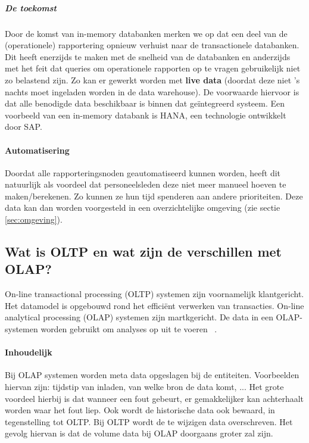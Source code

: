 \subparagraph{De toekomst}
Door de komst van in-memory databanken merken we op dat een deel van de (operationele) rapportering opnieuw verhuist naar de transactionele databanken. Dit heeft enerzijds te maken met de snelheid van de databanken en anderzijds met het feit dat queries om operationele rapporten op te vragen gebruikelijk niet zo belastend zijn. Zo kan er gewerkt worden met \textbf{live data} (doordat deze niet 's nachts moet ingeladen worden in de data warehouse). De voorwaarde hiervoor is dat alle benodigde data beschikbaar is binnen dat geïntegreerd systeem. Een voorbeeld van een in-memory databank is HANA, een technologie ontwikkelt door SAP.

\paragraph{Automatisering}
Doordat alle rapporteringsnoden geautomatiseerd kunnen worden, heeft dit natuurlijk als voordeel dat personeelsleden deze niet meer manueel hoeven te maken/berekenen. Zo kunnen ze hun tijd spenderen aan andere prioriteiten. Deze data kan dan worden voorgesteld in een overzichtelijke omgeving (zie sectie \ref{sec:omgeving}).

\subsection{Wat is OLTP en wat zijn de verschillen met OLAP?}
\label{sec:oltp-vs-olap}
On-line transactional processing (OLTP) systemen zijn voornamelijk klantgericht. Het datamodel is opgebouwd rond het efficiënt verwerken van transacties. On-line analytical processing (OLAP) systemen zijn martkgericht. De data in een OLAP-systemen worden gebruikt om analyses op uit te voeren ~\autocite{Satyanarayana2010}.

\paragraph{Inhoudelijk}
Bij OLAP systemen worden meta data opgeslagen bij de entiteiten. Voorbeelden hiervan zijn: tijdstip van inladen, van welke bron de data komt, ... Het grote voordeel hierbij is dat wanneer een fout gebeurt, er gemakkelijker kan achterhaalt worden waar het fout liep. Ook wordt de historische data ook bewaard, in tegenstelling tot OLTP. Bij OLTP wordt de te wijzigen data overschreven. Het gevolg hiervan is dat de volume data bij OLAP doorgaans groter zal zijn.


